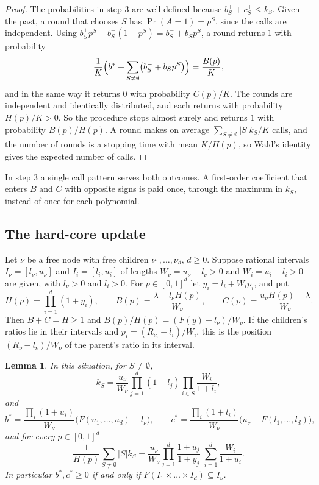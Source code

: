 \documentclass[11pt]{amsart}
\newtheorem{lemma}[theorem]{Lemma}
\begin{document}
\begin{proof}
The probabilities in step 3 are well defined because $b_S^\pm+c_S^\pm\le k_S$. Given the past, a round that chooses $S$ has $\Pr(A=1)=p^S$, since the calls are independent. Using $b_S^+p^S+b_S^-(1-p^S)=b_S^-+b_Sp^S$, a round returns $1$ with probability
\[
\frac1K\Bigl(b^*+\sum_{S\ne\emptyset}\bigl(b_S^-+b_Sp^S\bigr)\Bigr)=\frac{B(p)}K,
\]
and in the same way it returns $0$ with probability $C(p)/K$. The rounds are independent and identically distributed, and each returns with probability $H(p)/K>0$. So the procedure stops almost surely and returns $1$ with probability $B(p)/H(p)$. A round makes on average $\sum_{S\ne\emptyset}|S|k_S/K$ calls, and the number of rounds is a stopping time with mean $K/H(p)$, so Wald's identity gives the expected number of calls.
\end{proof}

In step 3 a single call pattern serves both outcomes. A first-order coefficient that enters $B$ and $C$ with opposite signs is paid once, through the maximum in $k_S$, instead of once for each polynomial.

\subsection*{The hard-core update}

Let $\nu$ be a free node with free children $\nu_1,\dots,\nu_d$, $d\ge0$. Suppose rational intervals $I_\nu=[l_\nu,u_\nu]$ and $I_i=[l_i,u_i]$ of lengths $W_\nu=u_\nu-l_\nu>0$ and $W_i=u_i-l_i>0$ are given, with $l_\nu>0$ and $l_i>0$. For $p\in[0,1]^d$ let $y_i=l_i+W_ip_i$, and put
\[
H(p)=\prod_{i=1}^d(1+y_i),\qquad B(p)=\frac{\lambda-l_\nu H(p)}{W_\nu},\qquad C(p)=\frac{u_\nu H(p)-\lambda}{W_\nu}.
\]
Then $B+C=H\ge1$ and $B(p)/H(p)=(F(y)-l_\nu)/W_\nu$. If the children's ratios lie in their intervals and $p_i=(R_{\nu_i}-l_i)/W_i$, this is the position $(R_\nu-l_\nu)/W_\nu$ of the parent's ratio in its interval.

\begin{lemma}\label{lem:tables}
In this situation, for $S\ne\emptyset$,
\[
k_S=\frac{u_\nu}{W_\nu}\prod_{j=1}^d(1+l_j)\prod_{i\in S}\frac{W_i}{1+l_i},
\]
and
\[
b^*=\frac{\prod_i(1+u_i)}{W_\nu}\bigl(F(u_1,\dots,u_d)-l_\nu\bigr),\qquad
c^*=\frac{\prod_i(1+l_i)}{W_\nu}\bigl(u_\nu-F(l_1,\dots,l_d)\bigr),
\]
and for every $p\in[0,1]^d$
\begin{equation}\label{eq:offspring}
\frac1{H(p)}\sum_{S\ne\emptyset}|S|k_S=\frac{u_\nu}{W_\nu}\prod_{j=1}^d\frac{1+u_j}{1+y_j}\;\sum_{i=1}^d\frac{W_i}{1+u_i}.
\end{equation}
In particular $b^*,c^*\ge0$ if and only if $F(I_1\times\dots\times I_d)\subseteq I_\nu$.
\end{lemma}
\end{document}
